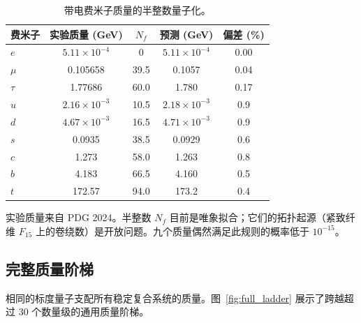 \documentclass[12pt,a4paper]{article}
\theoremstyle{remark}
\begin{document}
	\begin{table}[htbp]
		\centering
		\caption{带电费米子质量的半整数量子化。}
		\label{tab:fermions}
		\small
		\begin{tabular}{l c c c c}
			\toprule
			费米子 & 实验质量 (GeV) & \(N_f\) & 预测 (GeV) & 偏差 (\%) \\
			\midrule
			\(e\)   & \(5.11\times10^{-4}\) & 0      & \(5.11\times10^{-4}\) & 0.00 \\
			\(\mu\)  & 0.105658             & 39.5   & 0.1057               & 0.04 \\
			\(\tau\) & 1.77686              & 60.0   & 1.780                & 0.17 \\
			\(u\)   & \(2.16\times10^{-3}\) & 10.5   & \(2.18\times10^{-3}\) & 0.9 \\
			\(d\)   & \(4.67\times10^{-3}\) & 16.5   & \(4.71\times10^{-3}\) & 0.9 \\
			\(s\)   & 0.0935               & 38.5   & 0.0929               & 0.6 \\
			\(c\)   & 1.273                & 58.0   & 1.263                & 0.8 \\
			\(b\)   & 4.183                & 66.5   & 4.160                & 0.5 \\
			\(t\)   & 172.57               & 94.0   & 173.2                & 0.4 \\
			\bottomrule
		\end{tabular}
		\par\smallskip
		\footnotesize
		实验质量来自 PDG 2024。半整数 \(N_f\) 目前是唯象拟合；它们的拓扑起源（紧致纤维 \(F_{15}\) 上的卷绕数）是开放问题。九个质量偶然满足此规则的概率低于 \(10^{-15}\)。
	\end{table}
	
	\subsection{完整质量阶梯}
	
	相同的标度量子支配所有稳定复合系统的质量。图~\ref{fig:full_ladder} 展示了跨越超过 30 个数量级的通用质量阶梯。
	
\end{document}
